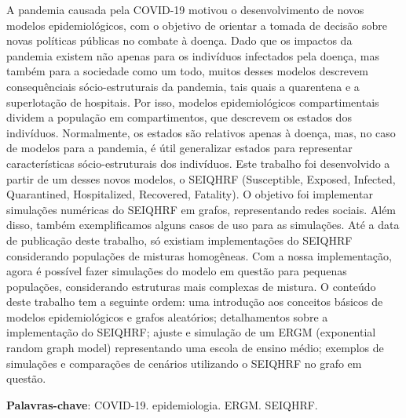 \setlength{\absparsep}{18pt} %
\begin{resumo}
  A pandemia causada pela COVID-19 motivou o desenvolvimento de novos modelos 
  epidemiológicos, com o objetivo de orientar a tomada de decisão sobre novas 
  políticas públicas no combate à doença.
  Dado que os impactos da pandemia existem não apenas para os indivíduos 
  infectados pela doença, mas também para a sociedade como um todo, 
  muitos desses modelos descrevem consequênciais sócio-estruturais 
  da pandemia, tais quais a quarentena e a superlotação de hospitais.
  Por isso, modelos epidemiológicos compartimentais dividem a população em 
  compartimentos, que descrevem os estados dos indivíduos. Normalmente, os 
  estados são relativos apenas à doença, mas, no caso de modelos para a 
  pandemia, é útil generalizar estados para representar características 
  sócio-estruturais dos indivíduos.
  Este trabalho foi desenvolvido a partir de um desses novos modelos, o 
  SEIQHRF (Susceptible, Exposed, Infected, Quarantined, Hospitalized, 
  Recovered, Fatality). O objetivo foi implementar simulações numéricas do 
  SEIQHRF em grafos, representando redes sociais.
  Além disso, também exemplificamos alguns casos de uso para as simulações.
  Até a data de publicação deste trabalho, só existiam implementações do 
  SEIQHRF considerando populações de misturas homogêneas. 
  Com a nossa implementação, agora é possível fazer simulações do modelo 
  em questão para pequenas populações, considerando estruturas mais complexas 
  de mistura.
  O conteúdo deste trabalho tem a seguinte ordem: 
  uma introdução aos conceitos básicos de modelos epidemiológicos e 
  grafos aleatórios; detalhamentos sobre a implementação do SEIQHRF; 
  ajuste e simulação de um ERGM (exponential random graph model) 
  representando uma escola de ensino médio; exemplos de simulações e 
  comparações de cenários utilizando o SEIQHRF no grafo em questão.

   \vspace{\onelineskip}
 
   \noindent 
   \textbf{Palavras-chave}: COVID-19. epidemiologia. ERGM. SEIQHRF.
\end{resumo}

